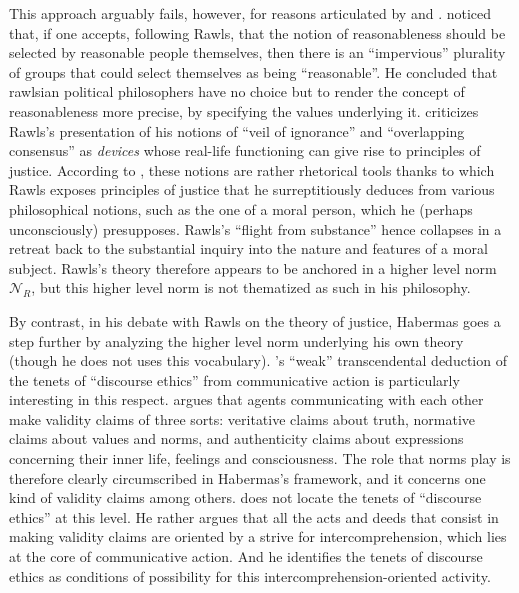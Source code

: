 \documentclass[preprint, french, english, 11pt, authoryear]{elsarticle}%
\begin{document}
This approach arguably fails, however, for reasons articulated by \cite{habermas_reconciliation_1995} and \cite{estlund_democratic_2009}. 
\citet{estlund_democratic_2009} noticed that, if one accepts, following Rawls, that the notion of reasonableness should be selected by reasonable people themselves, then there is an “impervious” plurality of groups that could select themselves as being “reasonable”. 
He concluded that rawlsian political philosophers have no choice but to render the concept of reasonableness more precise, by specifying the values underlying it. 
\cite{habermas_reconciliation_1995} criticizes Rawls's presentation of his notions of “veil of ignorance” and  “overlapping consensus” as \emph{devices} whose real-life functioning can give rise to principles of justice. 
According to \cite{habermas_reconciliation_1995}, these notions are rather rhetorical tools thanks to which Rawls exposes principles of justice that he surreptitiously deduces from various philosophical notions, such as the one of a moral person, which he (perhaps unconsciously) presupposes. 
Rawls's ``flight from substance'' hence collapses in a retreat back to the substantial inquiry into the nature and features of a moral subject.  Rawls's theory therefore appears to be anchored in a higher level norm $\mathscr{N}_R$, but this higher level norm is not thematized as such in his philosophy.

By contrast, in his debate with Rawls on the theory of justice, Habermas goes a step further by analyzing the higher level norm underlying his own theory (though he does not uses this vocabulary). 
\citet{habermas_moralbewustsein_1983}'s “weak” transcendental deduction of the tenets of “discourse ethics” from communicative action is particularly interesting in this respect. 
\citet{habermas_theorie_1981} argues that agents communicating with each other make validity claims of three sorts: veritative claims about truth, normative claims about values and norms, and authenticity claims about expressions concerning their inner life, feelings and consciousness. 
The role that norms play is therefore clearly circumscribed in Habermas's framework, and it concerns one kind of validity claims among others. 
\cite{habermas_moralbewustsein_1983} does not locate the tenets of “discourse ethics” at this level. 
He rather argues that all the acts and deeds that consist in making validity claims are oriented by a strive for intercomprehension, which lies at the core of communicative action. And he identifies the tenets of discourse ethics as conditions of possibility for this intercomprehension-oriented activity. 
\end{document}
